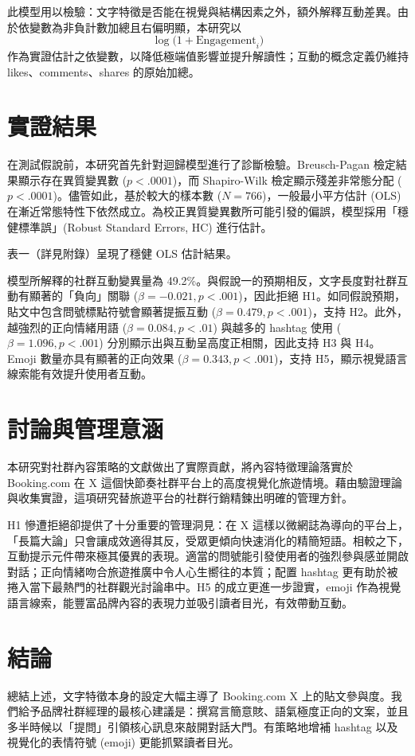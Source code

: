 \documentclass[12pt,a4paper,fontset=none]{ctexart}
\begin{document}
此模型用以檢驗：文字特徵是否能在視覺與結構因素之外，額外解釋互動差異。由於依變數為非負計數加總且右偏明顯，本研究以
\[
\log\bigl(1 + \text{Engagement}_i\bigr)
\]
作為實證估計之依變數，以降低極端值影響並提升解讀性；互動的概念定義仍維持 likes、comments、shares 的原始加總。

\section{實證結果}
在測試假說前，本研究首先針對迴歸模型進行了診斷檢驗。Breusch-Pagan 檢定結果顯示存在異質變異數 ($p < .0001$)，而 Shapiro-Wilk 檢定顯示殘差非常態分配 ($p < .0001$)。儘管如此，基於較大的樣本數 ($N = 766$)，一般最小平方估計 (OLS) 在漸近常態特性下依然成立。為校正異質變異數所可能引發的偏誤，模型採用「穩健標準誤」(Robust Standard Errors, HC) 進行估計。

表一（詳見附錄）呈現了穩健 OLS 估計結果。

模型所解釋的社群互動變異量為 49.2\%。與假說一的預期相反，文字長度對社群互動有顯著的「負向」關聯 ($\beta = -0.021, p < .001$)，因此拒絕 H1。如同假說預期，貼文中包含問號標點符號會顯著提振互動 ($\beta = 0.479, p < .001$)，支持 H2。此外，越強烈的正向情緒用語 ($\beta = 0.084, p < .01$) 與越多的 hashtag 使用 ($\beta = 1.096, p < .001$) 分別顯示出與互動呈高度正相關，因此支持 H3 與 H4。Emoji 數量亦具有顯著的正向效果 ($\beta = 0.343, p < .001$)，支持 H5，顯示視覺語言線索能有效提升使用者互動。

\section{討論與管理意涵}
本研究對社群內容策略的文獻做出了實際貢獻，將內容特徵理論落實於 Booking.com 在 X 這個快節奏社群平台上的高度視覺化旅遊情境。藉由驗證理論與收集實證，這項研究替旅遊平台的社群行銷精鍊出明確的管理方針。

H1 慘遭拒絕卻提供了十分重要的管理洞見：在 X 這樣以微網誌為導向的平台上，「長篇大論」只會讓成效適得其反，受眾更傾向快速消化的精簡短語。相較之下，互動提示元件帶來極其優異的表現。適當的問號能引發使用者的強烈參與感並開啟對話；正向情緒吻合旅遊推廣中令人心生嚮往的本質；配置 hashtag 更有助於被捲入當下最熱門的社群觀光討論串中。H5 的成立更進一步證實，emoji 作為視覺語言線索，能豐富品牌內容的表現力並吸引讀者目光，有效帶動互動。

\section{結論}
總結上述，文字特徵本身的設定大幅主導了 Booking.com X 上的貼文參與度。我們給予品牌社群經理的最核心建議是：撰寫言簡意賅、語氣極度正向的文案，並且多半時候以「提問」引領核心訊息來敲開對話大門。有策略地增補 hashtag 以及視覺化的表情符號 (emoji) 更能抓緊讀者目光。
\end{document}
